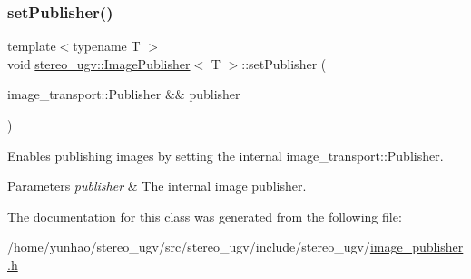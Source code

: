 \subsubsection{\texorpdfstring{set\+Publisher()}{setPublisher()}}
{\footnotesize\ttfamily template$<$typename T $>$ \\
void \hyperlink{classstereo__ugv_1_1ImagePublisher}{stereo\+\_\+ugv\+::\+Image\+Publisher}$<$ T $>$\+::set\+Publisher (\begin{DoxyParamCaption}\item[{image\+\_\+transport\+::\+Publisher \&\&}]{publisher }\end{DoxyParamCaption})\hspace{0.3cm}{\ttfamily [inline]}}



Enables publishing images by setting the internal image\+\_\+transport\+::\+Publisher. 


\begin{DoxyParams}{Parameters}
{\em publisher} & The internal image publisher. \\
\hline
\end{DoxyParams}


The documentation for this class was generated from the following file\+:\begin{DoxyCompactItemize}
\item 
/home/yunhao/stereo\+\_\+ugv/src/stereo\+\_\+ugv/include/stereo\+\_\+ugv/\hyperlink{image__publisher_8h}{image\+\_\+publisher.\+h}\end{DoxyCompactItemize}
